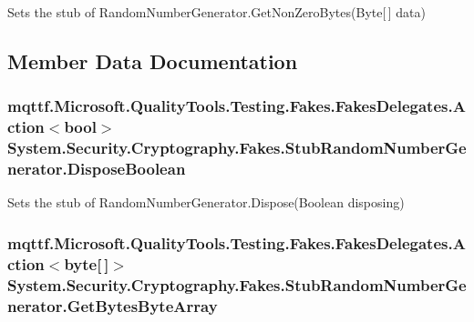Sets the stub of Random\-Number\-Generator.\-Get\-Non\-Zero\-Bytes(\-Byte\mbox{[}$\,$\mbox{]} data)



\subsection{Member Data Documentation}
\hypertarget{class_system_1_1_security_1_1_cryptography_1_1_fakes_1_1_stub_random_number_generator_abc95625bc1a4c77f8aaf338be82122cf}{
\subsubsection[{Dispose\-Boolean}]{\setlength{\rightskip}{0pt plus 5cm}mqttf.\-Microsoft.\-Quality\-Tools.\-Testing.\-Fakes.\-Fakes\-Delegates.\-Action$<$bool$>$ System.\-Security.\-Cryptography.\-Fakes.\-Stub\-Random\-Number\-Generator.\-Dispose\-Boolean}}\label{class_system_1_1_security_1_1_cryptography_1_1_fakes_1_1_stub_random_number_generator_abc95625bc1a4c77f8aaf338be82122cf}


Sets the stub of Random\-Number\-Generator.\-Dispose(\-Boolean disposing)

\hypertarget{class_system_1_1_security_1_1_cryptography_1_1_fakes_1_1_stub_random_number_generator_a70c6c0108ebe980dd1b5dda4bf65fc03}{
\subsubsection[{Get\-Bytes\-Byte\-Array}]{\setlength{\rightskip}{0pt plus 5cm}mqttf.\-Microsoft.\-Quality\-Tools.\-Testing.\-Fakes.\-Fakes\-Delegates.\-Action$<$byte\mbox{[}$\,$\mbox{]}$>$ System.\-Security.\-Cryptography.\-Fakes.\-Stub\-Random\-Number\-Generator.\-Get\-Bytes\-Byte\-Array}}\label{class_system_1_1_security_1_1_cryptography_1_1_fakes_1_1_stub_random_number_generator_a70c6c0108ebe980dd1b5dda4bf65fc03}


